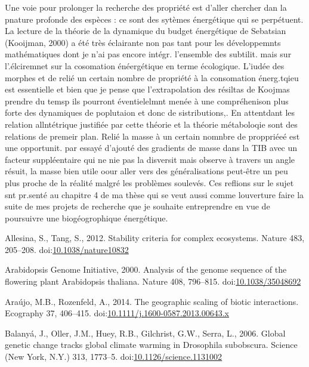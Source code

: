 Une voie pour prolonger la recherche des propriété est d'aller chercher
dan la pnature profonde des espèces : ce sont des sytèmes énergétique
qui se perpétuent. La lecture de la théorie de la dynamique du budget
énergétique de Sebatsian (Kooijman, 2000) a été très éclairante non pas
tant pour les développemnts mathématiques dont je n'ai pas encore
intégr. l'ensemble des subtilit. mais sur l'.élciremnet sur la
cosomation énéergétique en terme écologique. L'iudée des morphes et de
relié un certain nombre de propriété à la consomation énerg.tqieu est
essentielle et bien que je pense que l'extrapolation des résiltas de
Koojmas prendre du temsp ils pourront éventielelmnt menée à une
compréhenison plus forte des dynamiques de poplutaion et donc de
sistributions,. En attentdant les relation allntétrique justifiée par
cette théorie et la théorie métaboloqie sont des relations de premeir
plan. Relié la masse à un certain nomnbre de proppriéeé est une
opportunit. par essayé d'ajouté des gradients de masse dans la TIB avec
un facteur suppléentaire qui ne nie pas la disversit mais observe à
travers un angle résuit, la masse bien utile oour aller vers des
généralisations peut-être un peu plus proche de la réalité malgré les
problèmes soulevés. Ces reflions sur le sujet snt pr.senté au chapitre 4
de ma thèse qui se veut aussi comme louverture faire la suite de mes
projets de recherche que je souhaite entreprendre en vue de poursuivre
une biogéogrophique énergétique.

\hypertarget{refs}{}
\hypertarget{ref-Allesina2012a}{}
Allesina, S., Tang, S., 2012. Stability criteria for complex ecosystems.
Nature 483, 205--208.
doi:\href{https://doi.org/10.1038/nature10832}{10.1038/nature10832}

\hypertarget{ref-TheArabidopsisGenomeInitiative2000}{}
Arabidopsis Genome Initiative, 2000. Analysis of the genome sequence of
the flowering plant Arabidopsis thaliana. Nature 408, 796--815.
doi:\href{https://doi.org/10.1038/35048692}{10.1038/35048692}

\hypertarget{ref-Araujo2014}{}
Araújo, M.B., Rozenfeld, A., 2014. The geographic scaling of biotic
interactions. Ecography 37, 406--415.
doi:\href{https://doi.org/10.1111/j.1600-0587.2013.00643.x}{10.1111/j.1600-0587.2013.00643.x}

\hypertarget{ref-Balanya2006}{}
Balanyá, J., Oller, J.M., Huey, R.B., Gilchrist, G.W., Serra, L., 2006.
Global genetic change tracks global climate warming in Drosophila
subobscura. Science (New York, N.Y.) 313, 1773--5.
doi:\href{https://doi.org/10.1126/science.1131002}{10.1126/science.1131002}

